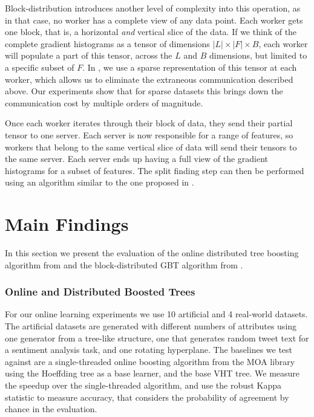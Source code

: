 Block-distribution introduces another level of complexity into this operation, as
in that case, no worker has a complete view of any data point. Each worker gets one block,
that is, a horizontal \emph{and} vertical slice of the data. If we think of the complete
gradient histograms as a tensor of dimensions $|L| \times |F| \times B$, each worker
will populate a part of this tensor, across the $L$ and $B$ dimensions, but limited to a specific
subset of $F$. In \blockgbt, we use a sparse representation of this tensor at each worker, which allows
us to eliminate the extraneous communication described above. Our experiments show
that for sparse datasets this brings down the communication cost by multiple orders
of magnitude.

Once each worker iterates
through their block of data, they send their partial tensor to one server. Each server
is now responsible for a range of features, so workers that belong to the same vertical
slice of data will send their tensors to the same server. Each server ends up having
a full view of the gradient histograms for a subset of features. The split finding step
can then be performed using an algorithm similar to the one proposed in \citet{dimboost}.

\section{Main Findings}

In this section we present the evaluation of the online distributed tree boosting
algorithm from \boostvht and the block-distributed GBT algorithm from \blockgbt.

\subsubsection*{Online and Distributed Boosted Trees}
\label{sec:boostvht-results}

For our online learning experiments we use 10 artificial and 4 real-world datasets. The artificial
datasets are generated with different numbers of attributes using one generator
from a tree-like structure, one that generates random tweet text for a sentiment
analysis task, and one rotating hyperplane. The baselines we test against are
a single-threaded online boosting algorithm from the MOA \cite{bifet2010moa}
library using the Hoeffding tree as a base learner, and the base VHT tree.
We measure the speedup over the single-threaded algorithm, and use the
robust Kappa\cite{bifet2015efficient} statistic to measure accuracy,
that considers the probability of agreement by chance in the evaluation.

